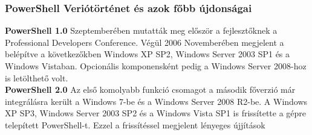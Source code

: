 \documentclass[12pt,oneside,justify,table]{book}
\begin{document}
\subsubsection{PowerShell Veriótörténet és azok főbb újdonságai}
\noindent\textbf{PowerShell 1.0}
 Szeptemberében mutatták meg először a fejlesztőknek a Professional Developers Conference. 
Végül 2006 Novemberében megjelent a belépítve a következőkben Windows XP SP2, Windows Server 2003 SP1 és a Windows Vistaban. Opcionális komponensként pedig a Windows Server 2008-hoz is letölthető volt.\\
\break
\noindent\textbf{PowerShell 2.0}
\newline Az első komolyabb funkció csomagot a második főverzió már integrálásra került a Windows 7-be és a Windows Server 2008 R2-be. A Windows XP SP3, Windows Server 2003 SP2 és a Windows Vista SP1 is frissítette a gépre telepített PowerShell-t.
Ezzel a frissítéssel megjelent lényeges újjítások
\end{document}
